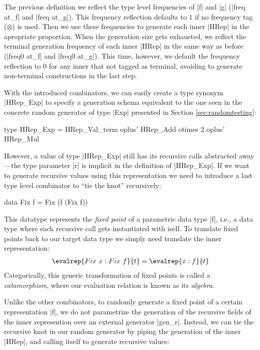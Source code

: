The previous definition we reflect the type level frequencies of |f| and |g|
(|freq at_f| and |freq at_g|).
%
This frequency reflection defaults to $1$ if no frequency tag ($\otimes$) is
used.
%
Then we use these frequencies to generate each inner |HRep| in the apropriate
proportion.
%
When the generation size gets exhausted, we reflect the terminal generation
frequency of each inner |HRep| in the same way as before (|freq0 at_f| and
|freq0 at_g|).
%
This time, however, we default the frequency reflection to $0$ for any inner
that not tagged as terminal, avoiding to generate non-terminal constructions in
the last step.


With the introduced combinators, we can easily create a type synonym |HRep_Exp|
to specify a generation schema equivalent to the one seen in the concrete random
generator of type |Exp| presented in Section \ref{sec:randomtesting}:

\begin{code}
type HRep_Exp  =       HRep_Val_term
               oplus'  HRep_Add  otimes 2
               oplus'  HRep_Mul
\end{code}

However, a value of type |HRep_Exp| still has its recursive calls abstracted
away---the type parameter |r| is implicit in the definition of |HRep_Exp|.
%
If we want to generate recursive values using this representation we need to
introduce a last type level combinator to ``tie the knot'' recursively:

\begin{code}
  data Fix f = Fix (f (Fix f))
\end{code}

This datatype represents the \emph{fixed point} of a parametric data type |f|,
i.e., a data type where each recursive call gets instantiated with iself.
%
To translate fixed points back to our target data type we simply need translate
the inner representation:
%
\begin{align*}
  \evalrep{Fix\ x : Fix\ f}{t} = \evalrep{x : f}{t}
\end{align*}
%
Categorically, this generic transformation of fixed points is called a
\emph{catamorphism}, where our evaluation relation is known as its
\emph{algebra}.


Unlike the other combinators, to randomly generate a fixed point of a certain
representation |f|, we do not parametrize the generation of the recursive fields
of the inner represention over an external generator |gen_r|.
%
Instead, we can tie the recursive knot in our random generator by piping the
generation of the inner |HRep|, and calling itself to generate recursive values:

